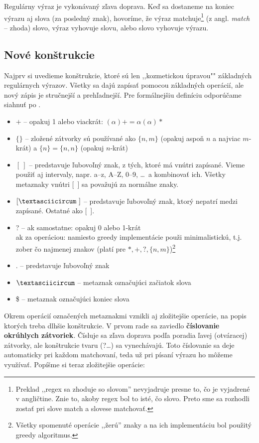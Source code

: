 Regulárny výraz je vykonávaný zľava doprava. Keď sa dostaneme na koniec výrazu aj slova (za posledný znak), hovoríme, že výraz matchuje\footnote{Preklad ,,regex sa zhoduje so slovom'' nevyjadruje presne to, čo je vyjadrené v angličtine. Znie to, akoby regex bol to isté, čo slovo. Preto sme sa rozhodli zostať pri slove match a slovese matchovať.} (z angl. \textit{match} -- zhoda) slovo, výraz vyhovuje slovu, alebo slovo vyhovuje výrazu.

\subsection{Nové konštrukcie}

Najprv si uvedieme konštrukcie, ktoré sú len ,,kozmetickou úpravou"" základných regulárnych výrazov. Všetky sa dajú zapísať pomocou základných operácií, ale nový zápis je stručnejší a prehľadnejší. Pre formálnejšiu definíciu odporúčame siahnuť po \cite{mojaBak}.
\begin{itemize}
\item $+$ -- opakuj 1 alebo viackrát: $(\alpha)+=\alpha(\alpha)*$
\item $\lbrace \rbrace$ -- zložené zátvorky sú používané ako $\{n,m\}$ (opakuj aspoň $n$ a najviac $m$-krát) a $\{n\}=\{n,n\}$ (opakuj $n$-krát)
\item $[~]$ -- predstavuje ľubovoľný znak, z tých, ktoré má vnútri zapísané. Vieme použiť aj intervaly, napr. a--z, A--Z, 0--9, \dots~a kombinovať ich. Všetky metaznaky vnútri [~] sa považujú za normálne znaky.
\item $[\textasciicircum~]$ -- predstavuje ľubovoľný znak, ktorý nepatrí medzi zapísané. Ostatné ako [~].
\item ? -- ak samostatne: opakuj 0 alebo 1-krát \\
ak za operáciou: namiesto greedy implementácie použi minimalistickú, t.j. zober čo najmenej znakov (platí pre $*,+,?,\lbrace n,m \rbrace$)\footnote{Všetky spomenuté operácie ,,žerú'' znaky a na ich implementáciu bol použitý greedy algoritmus.}
\item . -- predstavuje ľubovoľný znak
\item $\textasciicircum$ -- metaznak označujúci začiatok slova
\item \$ -- metaznak označujúci koniec slova
\end{itemize}

Okrem operácií označených metaznakmi vznikli aj zložitejšie operácie, na popis ktorých treba dlhšie konštrukcie. V prvom rade sa zaviedlo \textbf{číslovanie okrúhlych zátvoriek}. Čísluje sa zľava doprava podľa poradia ľavej (otváracej) zátvorky, ale konštrukcie tvaru (?\dots) sa vynechávajú. Toto číslovanie sa deje automaticky pri každom matchovaní, teda už pri písaní výrazu ho môžeme využívať. Popíšme si teraz zložitejšie operácie:

